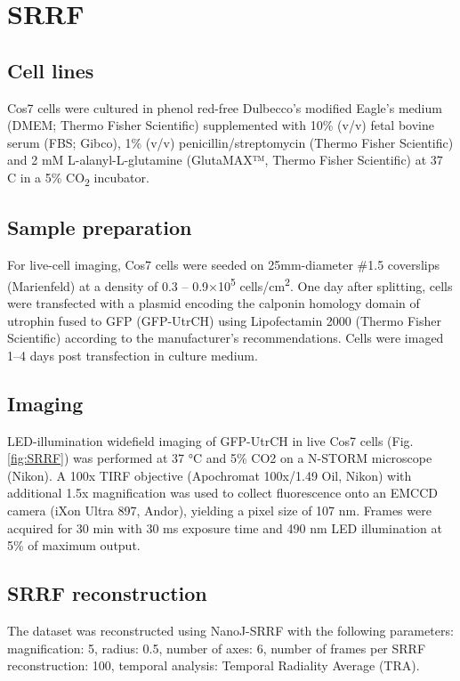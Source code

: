 \section{SRRF}

\subsection{Cell lines}

Cos7 cells were cultured in phenol red-free Dulbecco’s modified Eagle’s medium (DMEM; Thermo Fisher Scientific) supplemented with 10\% (v/v) fetal bovine serum (FBS; Gibco), 1\% (v/v) penicillin/streptomycin (Thermo Fisher Scientific) and 2 mM L-alanyl-L-glutamine (GlutaMAX™, Thermo Fisher Scientific) at 37 \degree C in a 5\% CO\textsubscript{2} incubator.

\subsection{Sample preparation}

For live-cell imaging, Cos7 cells were seeded on 25mm-diameter \#1.5 coverslips (Marienfeld) at a density of 0.3 – 0.9×10\textsuperscript{5} cells/cm\textsuperscript{2}. One day after splitting, cells were transfected with a plasmid encoding the calponin homology domain of utrophin fused to GFP (GFP-UtrCH) \cite{burkel2007versatile} using Lipofectamin 2000 (Thermo Fisher Scientific) according to the manufacturer’s recommendations. Cells were imaged 1–4 days post transfection in culture medium.

\subsection{Imaging}

LED-illumination widefield imaging of GFP-UtrCH in live Cos7 cells (Fig. \ref{fig:SRRF}) was performed at 37 °C and 5\% CO2 on a N-STORM microscope (Nikon). A 100x TIRF objective (Apochromat 100x/1.49 Oil, Nikon) with additional 1.5x magnification was used to collect fluorescence onto an EMCCD camera (iXon Ultra 897, Andor), yielding a pixel size of 107 nm. Frames were acquired for 30 min with 30 ms exposure time and 490 nm LED illumination at 5\% of maximum output. 

\subsection{SRRF reconstruction}

The dataset was reconstructed using NanoJ-SRRF with the following parameters: magnification: 5, radius: 0.5, number of axes: 6,  number of frames per SRRF reconstruction: 100, temporal analysis: Temporal Radiality Average (TRA). 



